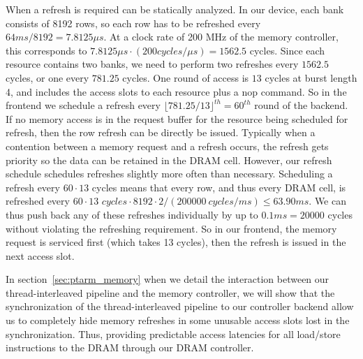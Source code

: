 When a refresh is required can be statically analyzed. 
In our device, each bank consists of 8192 rows, so each row has to be refreshed every $64\textit{ms}/8192=7.8125 {\mu}s$.
At a clock rate of 200 MHz of the memory controller, this corresponds to $7.8125 {\mu}s \cdot (200 \textit{cycles}/{\mu}s) = 1562.5$ cycles.
Since each resource contains two banks, we need to perform two refreshes every $1562.5$ cycles, or one every $781.25$ cycles.
One round of access is $13$ cycles at burst length 4, and includes the access slots to each resource plus a nop command. 
So in the frontend we schedule a refresh every $\lfloor 781.25/13 \rfloor^{th} = 60^{th}$ round of the backend.
If no memory access is in the request buffer for the resource being scheduled for refresh, then the row refresh can be directly be issued. 
Typically when a contention between a memory request and a refresh occurs, the refresh gets priority so the data can be retained in the DRAM cell. 
However, our refresh schedule schedules refreshes slightly more often than necessary.   
Scheduling a refresh every $60 \cdot 13$ cycles means that every row, and thus every DRAM cell, is refreshed every $60\cdot 13 \textit{ cycles}\cdot 8192\cdot 2/(200000~\textit{cycles}/\textit{ms}) \leq 63.90\textit{ms}$.
We can thus push back any of these refreshes individually by up to $0.1\textit{ms} = 20000$ cycles without violating the refreshing requirement.
So in our frontend, the memory request is serviced first (which takes 13 cycles), then the refresh is issued in the next access slot. 

In section~\ref{sec:ptarm_memory} when we detail the interaction between our thread-interleaved pipeline and the memory controller, we will show that the synchronization of the thread-interleaved pipeline to our controller backend allow us to completely hide memory refreshes in some unusable access slots lost in the synchronization.
Thus, providing predictable access latencies for all load/store instructions to the DRAM through our DRAM controller.



